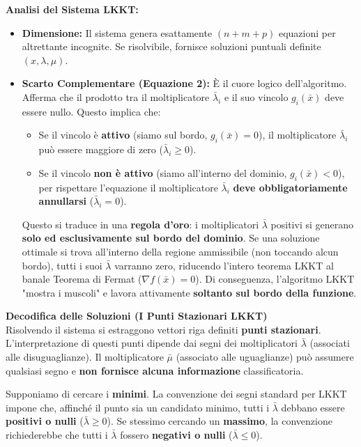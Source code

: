 \documentclass[12pt, a4paper]{article}
\begin{document}
	\textbf{Analisi del Sistema LKKT:}
	\begin{itemize}[label=\textcolor{titlecolor}{\textbullet}, itemsep=4pt, leftmargin=1.5cm]
		\item \textbf{Dimensione:} Il sistema genera esattamente \textbf{$(n + m + p)$} equazioni per altrettante incognite. Se risolvibile, fornisce soluzioni puntuali definite $(x, \lambda, \mu)$.
		\item \textbf{Scarto Complementare (Equazione 2):} È il cuore logico dell'algoritmo. Afferma che il prodotto tra il moltiplicatore $\bar{\lambda}_i$ e il suo vincolo $g_i(\bar{x})$ deve essere nullo. Questo implica che:
		\begin{itemize}
			\item Se il vincolo è \textbf{attivo} (siamo sul bordo, $g_i(\bar{x}) = 0$), il moltiplicatore $\bar{\lambda}_i$ può essere maggiore di zero ($\bar{\lambda}_i \ge 0$).
			\item Se il vincolo \textbf{non è attivo} (siamo all'interno del dominio, $g_i(\bar{x}) < 0$), per rispettare l'equazione il moltiplicatore $\bar{\lambda}_i$ \textbf{deve obbligatoriamente annullarsi} ($\bar{\lambda}_i = 0$).
		\end{itemize}
		Questo si traduce in una \textbf{regola d'oro}: i moltiplicatori $\bar{\lambda}$ positivi si generano \textbf{solo ed esclusivamente sul bordo del dominio}. Se una soluzione ottimale si trova all'interno della regione ammissibile (non toccando alcun bordo), tutti i suoi $\bar{\lambda}$ varranno zero, riducendo l'intero teorema LKKT al banale Teorema di Fermat ($\nabla f(\bar{x}) = 0$). Di conseguenza, l'algoritmo LKKT "mostra i muscoli" e lavora attivamente \textbf{soltanto sul bordo della funzione}.
	\end{itemize}
	
	\vspace{0.4cm}
	\textbf{Decodifica delle Soluzioni (I Punti Stazionari LKKT)}\\
	Risolvendo il sistema si estraggono vettori riga definiti \textbf{punti stazionari}. L'interpretazione di questi punti dipende dai segni dei moltiplicatori $\bar{\lambda}$ (associati alle disuguaglianze). Il moltiplicatore $\bar{\mu}$ (associato alle uguaglianze) può assumere qualsiasi segno e \textbf{non fornisce alcuna informazione} classificatoria.
	
	Supponiamo di cercare i \textbf{minimi}. La convenzione dei segni standard per LKKT impone che, affinché il punto sia un candidato minimo, tutti i $\bar{\lambda}$ debbano essere \textbf{positivi o nulli} ($\bar{\lambda} \ge 0$). Se stessimo cercando un \textbf{massimo}, la convenzione richiederebbe che tutti i $\bar{\lambda}$ fossero \textbf{negativi o nulli} ($\bar{\lambda} \le 0$).
	
\end{document}
